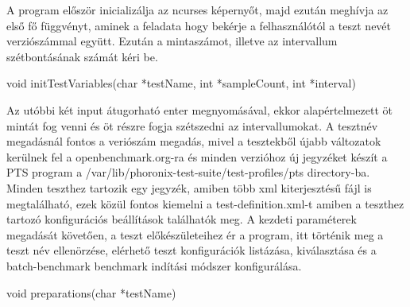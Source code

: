 
A program először inicializálja az ncurses képernyőt, majd ezután meghívja az első fő függvényt, aminek a feladata hogy bekérje a felhasználótól a teszt nevét verziószámmal együtt. Ezután a mintaszámot, illetve az intervallum szétbontásának számát kéri be.  

\begin{cpp}
void initTestVariables(char *testName, int *sampleCount, int *interval)
\end{cpp}

Az utóbbi két input átugorható enter megnyomásával, ekkor alapértelmezett öt mintát fog venni és öt részre fogja szétszedni az intervallumokat.
A tesztnév megadásnál fontos a veriószám megadás, mivel a tesztekből újabb változatok kerülnek fel a openbenchmark.org-ra és minden verzióhoz új jegyzéket készít a PTS program a /var/lib/phoronix-test-suite/test-profiles/pts directory-ba.
Minden teszthez tartozik egy jegyzék, amiben több xml kiterjesztésű fájl is megtalálható, ezek közül fontos kiemelni a test-definition.xml-t amiben a teszthez tartozó konfigurációs beállítások találhatók meg.
A kezdeti paraméterek megadását követően, a teszt előkészületeihez ér a program, itt történik meg a teszt név ellenörzése, elérhető teszt konfigurációk listázása, kiválasztása és a batch-benchmark benchmark indítási módszer konfigurálása. 

\begin{cpp}
void preparations(char *testName)
\end{cpp}

